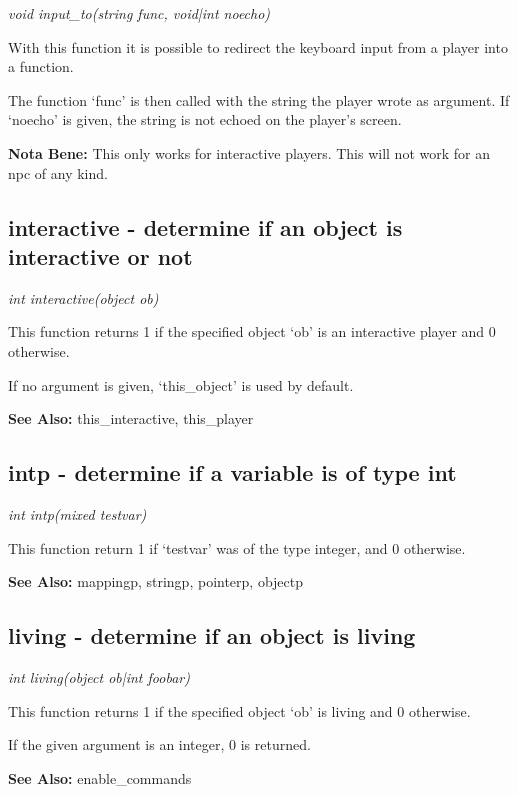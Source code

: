     {\em void input\_to(string func, void|int noecho)}

    With this function it is possible to redirect the keyboard
    input from a player into a function.

    The function `func' is then called with the string the player
    wrote as argument. If `noecho' is given, the string is not
    echoed on the player's screen.

    {\bf Nota Bene: }   This only works for interactive players. This will not work
    for an npc of any kind.



\subsection{interactive - determine if an object is interactive or not}

    {\em int interactive(object ob)}

    This function returns 1 if the specified object `ob' is an
    interactive player and 0 otherwise.

    If no argument is given, `this\_object' is used by default.

    {\bf See Also: }    this\_interactive, this\_player



\subsection{intp - determine if a variable is of type int}

    {\em int intp(mixed testvar)}

    This function return 1 if `testvar' was of the type integer,
    and 0 otherwise.

    {\bf See Also: }    mappingp, stringp, pointerp, objectp



\subsection{living - determine if an object is living}

    {\em int living(object ob|int foobar)}

    This function returns 1 if the specified object `ob' is
    living and 0 otherwise.
    
    If the given argument is an integer, 0 is returned.

    {\bf See Also: }    enable\_commands



